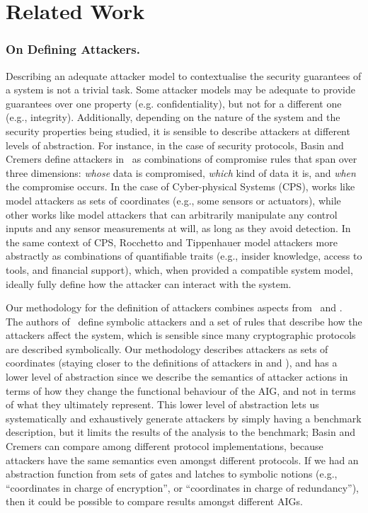 {\section{Related Work}
\label{sec:discussion}

\subsubsection{On Defining Attackers.} Describing an adequate attacker model to contextualise the security guarantees of a system is not a trivial task. Some attacker models may be adequate to provide guarantees over one property (e.g. confidentiality), but not for a different one (e.g., integrity). Additionally, depending on the nature of the system and the security properties being studied, it is sensible to describe attackers at different levels of abstraction. For instance, in the case of security protocols, Basin and Cremers define attackers in~\cite{KnowYourEnemy} as combinations of compromise rules that span over three dimensions:  \emph{whose} data is compromised, \emph{which} kind of data it is, and \emph{when} the compromise occurs. In the case of Cyber-physical Systems (CPS), works like \cite{Giraldo2018,Simei} model attackers as sets of coordinates (e.g., some sensors or  actuators), while other works like \cite{IFCPSSec,Cardenas2011,Urbina2016} model attackers that can arbitrarily manipulate any control inputs and any sensor measurements at will, as long as they avoid detection. In the same context of CPS, Rocchetto and Tippenhauer \cite{CPSProfiles} model attackers more abstractly as combinations of quantifiable traits (e.g., insider knowledge, access to tools, and financial support), which, when provided a compatible system model, ideally fully define how the attacker can interact with the system. 

Our methodology for the definition of attackers combines aspects from~\cite{KnowYourEnemy,Giraldo2018} and \cite{Simei}. The authors of~\cite{KnowYourEnemy} define symbolic attackers and a set of rules that describe how the attackers affect the system, which is sensible since many cryptographic protocols are described symbolically. Our methodology describes attackers as sets of coordinates (staying closer to the definitions of attackers in \cite{Giraldo2018} and \cite{Simei}), and has a lower level of abstraction since we describe the semantics of attacker actions in terms of how they change the functional behaviour of the AIG, and not in terms of what they ultimately represent. This lower level of abstraction lets us systematically and exhaustively generate attackers by simply having a benchmark description, but it limits the results of the analysis to the benchmark; Basin and Cremers can compare among different protocol implementations, because attackers have the same semantics even amongst different protocols. If we had an abstraction function from sets of gates and latches to symbolic notions (e.g., ``coordinates in charge of encryption'', or ``coordinates in charge of redundancy''), then it could be possible to compare results amongst different AIGs.

}

